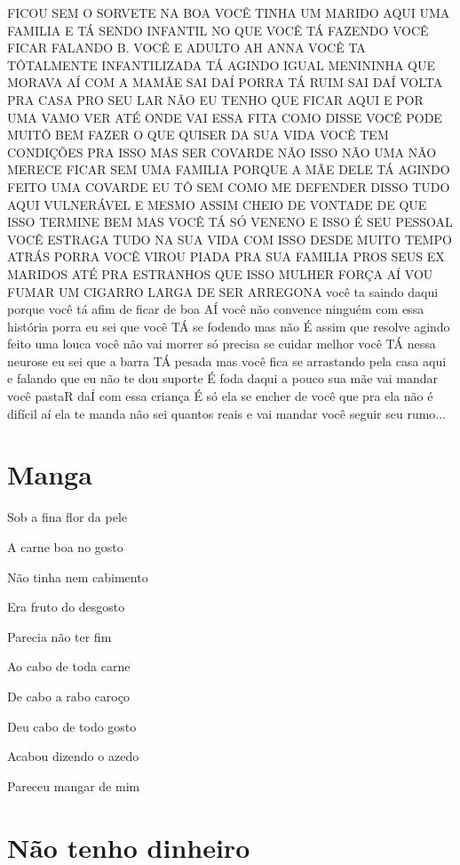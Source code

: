 FICOU SEM O SORVETE NA BOA VOCÊ TINHA UM MARIDO AQUI UMA FAMILIA E TÁ
SENDO INFANTIL NO QUE VOCÊ TÁ FAZENDO VOCÊ FICAR FALANDO B. VOCÊ E
ADULTO AH ANNA VOCÊ TA TÔTALMENTE INFANTILIZADA TÁ AGINDO IGUAL
MENININHA QUE MORAVA AÍ COM A MAMÃE SAI DAÍ PORRA TÁ RUIM SAI DAÍ VOLTA
PRA CASA PRO SEU LAR NÃO EU TENHO QUE FICAR AQUI E POR UMA VAMO VER ATÉ
ONDE VAI ESSA FITA COMO DISSE VOCÊ PODE MUITÔ BEM FAZER O QUE QUISER DA
SUA VIDA VOCÊ TEM CONDIÇÕES PRA ISSO MAS SER COVARDE NÃO ISSO NÃO UMA
NÃO MERECE FICAR SEM UMA FAMILIA PORQUE A MÃE DELE TÁ AGINDO FEITO UMA
COVARDE EU TÔ SEM COMO ME DEFENDER DISSO TUDO AQUI VULNERÁVEL E MESMO
ASSIM CHEIO DE VONTADE DE QUE ISSO TERMINE BEM MAS VOCÊ TÁ SÓ VENENO E
ISSO É SEU PESSOAL VOCÊ ESTRAGA TUDO NA SUA VIDA COM ISSO DESDE MUITO
TEMPO ATRÁS PORRA VOCÊ VIROU PIADA PRA SUA FAMILIA PROS SEUS EX MARIDOS
ATÉ PRA ESTRANHOS QUE ISSO MULHER FORÇA AÍ VOU FUMAR UM CIGARRO LARGA DE
SER ARREGONA você ta saindo daqui porque você tá afim de ficar de boa AÍ
você não convence ninguém com essa história porra eu sei que você TÁ se
fodendo mas não É assim que resolve agindo feito uma louca você não vai
morrer só precisa se cuidar melhor você TÁ nessa neurose eu sei que a
barra TÁ pesada mas você fica se arrastando pela casa aqui e falando que
eu não te dou suporte É foda daqui a pouco sua mãe vai mandar você
pastaR daÍ com essa criança É só ela se encher de você que pra ela não é
difícil aí ela te manda não sei quantos reais e vai mandar você seguir
seu rumo...

\chapter{Manga}

Sob a fina flor da pele

A carne boa no gosto

Não tinha nem cabimento

Era fruto do desgosto

Parecia não ter fim

Ao cabo de toda carne

De cabo a rabo caroço

Deu cabo de todo gosto

Acabou dizendo o azedo

Pareceu mangar de mim

\chapter{Não tenho dinheiro}

